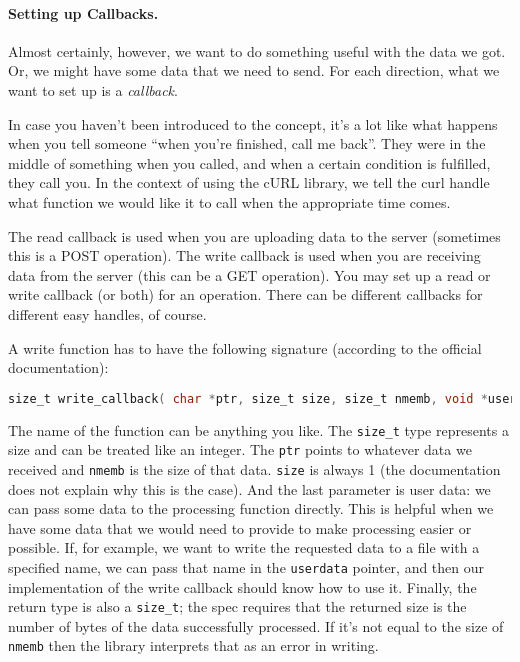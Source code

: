 \paragraph{Setting up Callbacks.} Almost certainly, however, we want to do something useful with the data we got. Or, we might have some data that we need to send. For each direction, what we want to set up is a \textit{callback}.

In case you haven't been introduced to the concept, it's a lot like what happens when you tell someone ``when you're finished, call me back''. They were in the middle of something when you called, and when a certain condition is fulfilled, they call you. In the context of using the cURL library, we tell the curl handle what function we would like it to call when the appropriate time comes.

The read callback is used when you are uploading data to the server (sometimes this is a POST operation). The write callback is used when you are receiving data from the server (this can be a GET operation). You may set up a read or write callback (or both) for an operation. There can be different callbacks for different easy handles, of course.

A write function has to have the following signature (according to the official documentation):
\begin{lstlisting}[language=C]
size_t write_callback( char *ptr, size_t size, size_t nmemb, void *userdata );
\end{lstlisting}

The name of the function can be anything you like. The \texttt{size\_t} type represents a size and can be treated like an integer. The \texttt{ptr} points to whatever data we received and \texttt{nmemb} is the size of that data. \texttt{size} is always 1 (the documentation does not explain why this is the case). And the last parameter is user data: we can pass some data to the processing function directly. This is helpful when we have some data that we would need to provide to make processing easier or possible. If, for example, we want to write the requested data to a file with a specified name, we can pass that name in the \texttt{userdata} pointer, and then our implementation of the write callback should know how to use it. Finally, the return type is also a \texttt{size\_t}; the spec requires that the returned size is the number of bytes of the data successfully processed. If it's not equal to the size of \texttt{nmemb} then the library interprets that as an error in writing.

